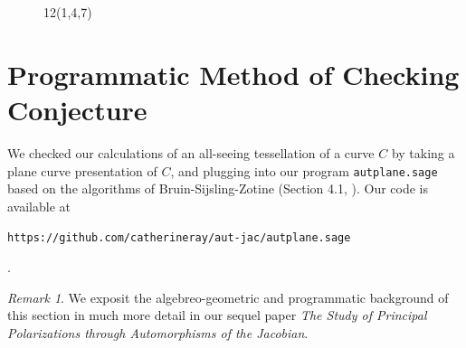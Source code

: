 \documentclass[12pt,reqno]{amsart}
\theoremstyle{definition}
\theoremstyle{remark}
\newtheorem*{remark}{Remark}
\begin{document}
\begin{figure}[htbp]
    \centering
    \qquad
    \caption{12(1,4,7)}%
    \label{fig:147}%
\end{figure}


\section{Programmatic Method of Checking Conjecture}

We checked our calculations of an all-seeing tessellation of a curve $C$ by taking a plane curve presentation of $C$, and plugging into our program \texttt{autplane.sage} based on the algorithms of Bruin-Sijsling-Zotine (Section 4.1, \cite{jeroen}). Our code is available at \begin{center} \texttt{https://github.com/catherineray/aut-jac/autplane.sage} \end{center}.

\begin{remark}We exposit the algebreo-geometric and programmatic background of this section in much more detail in our sequel paper \textit{The Study of Principal Polarizations through Automorphisms of the Jacobian}.\end{remark}
\end{document}
